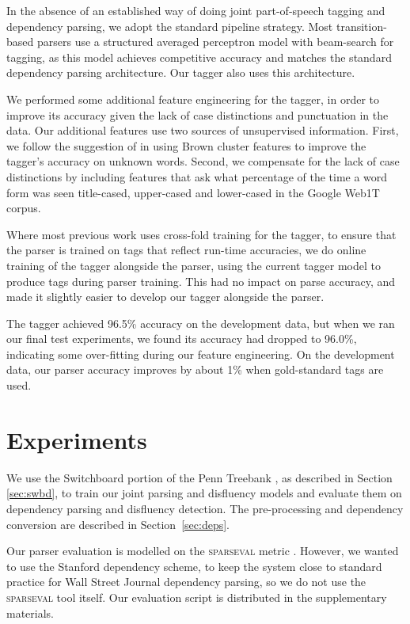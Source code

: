 \documentclass[11pt,letterpaper]{article}
\newcommand{\sparseval}{\textsc{sparseval}\xspace}
\begin{document}
In the absence of an established way of doing joint part-of-speech tagging and
dependency parsing, we adopt the standard pipeline strategy.  Most transition-based
parsers use a structured averaged perceptron model with beam-search for tagging,
as this model achieves competitive accuracy and matches the standard dependency
parsing architecture. Our tagger also uses this architecture.

We performed some additional feature engineering for the tagger, in order to
improve its accuracy given the lack of case distinctions and punctuation in
the data. Our additional features use two sources of unsupervised information.
First, we follow the suggestion of \citet{manning:11} in using Brown cluster
features to improve the tagger's accuracy on unknown words. Second, we compensate
for the lack of case distinctions by including features that ask what percentage
of the time a word form was seen title-cased, upper-cased and lower-cased in the
Google Web1T corpus. 

Where most previous work uses cross-fold training for the tagger, to ensure that the
parser is trained on tags that reflect run-time accuracies, we do online training
of the tagger alongside the parser, using the current tagger model to produce
tags during parser training.  This had no impact on parse accuracy, and made it
slightly easier to develop our tagger alongside the parser.

The tagger achieved 96.5\% accuracy on the development data, but when we ran our
final test experiments, we found its accuracy had dropped to 96.0\%, indicating
some over-fitting during our feature engineering.  On the development data,
our parser accuracy improves by about 1\% when gold-standard tags are used.

\section{Experiments}

We use the Switchboard portion of the Penn Treebank \citep{marcus:93}, as
described in Section \ref{sec:swbd}, to train our joint parsing and disfluency
models and evaluate them on dependency parsing and disfluency detection. The
pre-processing and dependency conversion are described in Section~\ref{sec:deps}.

Our parser evaluation is modelled on the \sparseval metric \citep{sparseval}.
However, we wanted to use the Stanford dependency scheme, to keep the system
close to standard practice for Wall Street Journal dependency parsing, so we
do not use the \sparseval tool itself.  Our evaluation script is distributed
in the supplementary materials.
\end{document}

